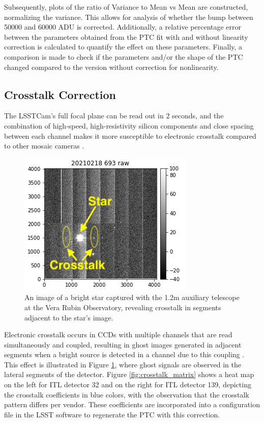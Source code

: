 Subsequently, plots of the ratio of Variance to Mean vs Mean are constructed, normalizing the variance. This allows for analysis of whether the bump between 50000 and 60000 ADU is corrected. Additionally, a relative percentage error between the parameters obtained from the PTC fit with and without linearity correction is calculated to quantify the effect on these parameters. Finally, a comparison is made to check if the parameters and/or the shape of the PTC changed compared to the version without correction for nonlinearity.


\subsection{Crosstalk Correction} \label{subsec:method_Crosstalk}

The LSSTCam's full focal plane can be read out in 2 seconds, and the combination of high-speed, high-resistivity silicon components and close spacing between each channel makes it more susceptible to electronic crosstalk compared to other mosaic cameras \citep{2015JInst..10C5010O}.

\vspace{3mm}

\begin{figure}[!htb]
    \centering
    \includegraphics{Figures/Crosstalk_effect.png}
    \caption{An image of a bright star captured with the 1.2m auxiliary telescope at the Vera Rubin Observatory, revealing crosstalk in segments adjacent to the star's image.}
    \label{fig:crosstalk}
\end{figure}

Electronic crosstalk occurs in CCDs with multiple channels that are read simultaneously and coupled, resulting in ghost images generated in adjacent segments when a bright source is detected in a channel due to this coupling \citep{2020SPIE11454E..39S}. This effect is illustrated in Figure \ref{fig:crosstalk}, where ghost signals are observed in the lateral segments of the detector. Figure \ref{fig:crosstalk_matrix} shows a heat map on the left for ITL detector 32 and on the right for ITL detector 139, depicting the crosstalk coefficients in blue colors, with the observation that the crosstalk pattern differs per vendor. These coefficients are incorporated into a configuration file in the LSST software to regenerate the PTC with this correction.

